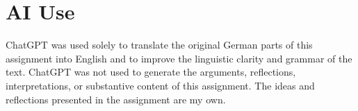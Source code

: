 \appendix

\section{AI Use} \label{AI Use}
ChatGPT was used solely to translate the original German parts of this assignment into English and to improve the linguistic clarity and grammar of the text. ChatGPT was not used to generate the arguments, reflections, interpretations, or substantive content of this assignment. The ideas and reflections presented in the assignment are my own. 